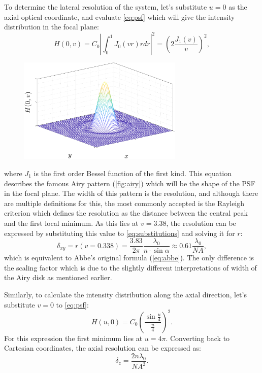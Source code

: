     To determine the lateral resolution of the system, let's substitute $u=0$ as the axial optical coordinate, and evaluate \autoref{eq:psf} which will give the intensity distribution in the focal plane:
    \begin{equation}
      H(0,v) = C_0 \left| \int_0^1 J_0(vr)rdr \right|^2 = \left(2\frac{J_1(v)}{v} \right) ^2,
      \label{eq:airy}
    \end{equation}
    \begin{figure}
      \centering
      \includegraphics[width=0.7\textwidth]{airy}
      \label{fig:airy}
    \end{figure}


    

    where $J_1$ is the first order Bessel function of the first kind. This equation describes the famous Airy pattern (\autoref{fig:airy}) which will be the shape of the PSF in the focal plane. The width of this pattern is the resolution, and although there are multiple definitions for this, the most commonly accepted is the Rayleigh criterion \cite{f.r.s_xxxi._1879, born_principles_2013} which defines the resolution as the distance between the central peak and the first local minimum. As this lies at $v=3.38$, the resolution can be expressed by substituting this value to \autoref{eq:substitutions} and solving it for $r$:
    \begin{equation}
      \delta_{xy} = r(v=0.338) = \frac{3.83}{2\pi} \frac{\lambda_0}{n\cdot \sin \alpha} \approx 0.61 \frac{\lambda_0}{NA},
      \label{eq:lateralRes}
    \end{equation}
    which is equivalent to Abbe's original formula (\autoref{eq:abbe}). The only difference is the scaling factor which is due to the slightly different interpretations of width of the Airy disk as mentioned earlier.

    Similarly, to calculate the intensity distribution along the axial direction, let's substitute $v=0$ to \autoref{eq:psf}:
    \begin{equation}
      H(u,0)=C_0\left( \frac{\sin \frac{u}{4}}{\frac{u}{4}}\right) ^2 . 
    \end{equation} 
    For this expression the first minimum lies at $u=4\pi$. Converting back to Cartesian coordinates, the axial resolution can be expressed as:
    \begin{equation}
      \delta_z = \frac{2n\lambda_0}{NA^2}.
      \label{eq:axialRes}
    \end{equation}

